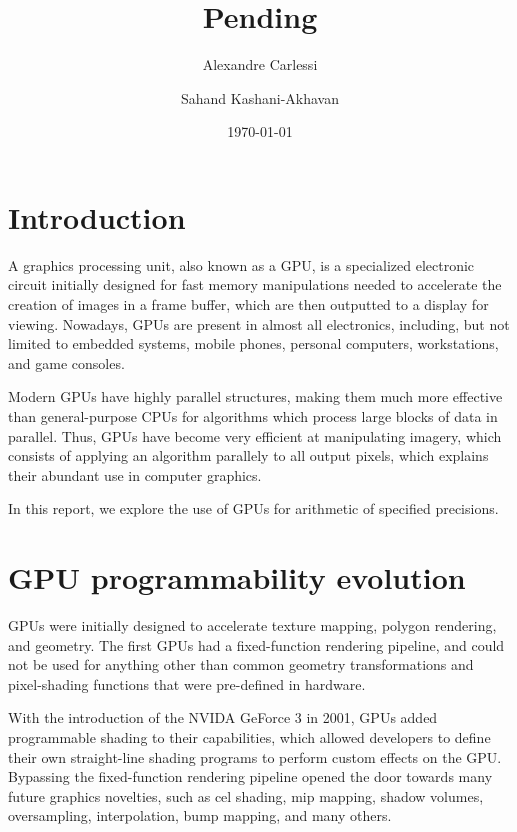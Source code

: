 \documentclass[10pt, a4paper]{report}
\begin{document}
\title{Pending}
\author{Alexandre Carlessi \and Sahand Kashani-Akhavan}
\date{\today}
\maketitle

\tableofcontents
\clearpage

\section{Introduction}
A graphics processing unit, also known as a GPU, is a specialized electronic
circuit initially designed for fast memory manipulations needed to accelerate
the creation of images in a frame buffer, which are then outputted to a display
for viewing.
Nowadays, GPUs are present in almost all electronics, including, but not limited
to embedded systems, mobile phones, personal computers, workstations, and game
consoles.

Modern GPUs have highly parallel structures, making them much more effective
than general-purpose CPUs for algorithms which process large blocks of data in
parallel.
Thus, GPUs have become very efficient at manipulating imagery, which consists
of applying an algorithm parallely to all output pixels, which explains their
abundant use in computer graphics.

In this report, we explore the use of GPUs for arithmetic of specified
precisions.

\section{GPU programmability evolution}
GPUs were initially designed to accelerate texture mapping, polygon rendering,
and geometry.
The first GPUs had a fixed-function rendering pipeline, and could not be used
for anything other than common geometry transformations and pixel-shading
functions that were pre-defined in hardware.

With the introduction of the NVIDA GeForce 3 in 2001, GPUs added programmable
shading to their capabilities, which allowed developers to define their own
straight-line shading programs to perform custom effects on the GPU.
Bypassing the fixed-function rendering pipeline opened the door towards many
future graphics novelties, such as cel shading, mip mapping, shadow volumes,
oversampling, interpolation, bump mapping, and many others.
\end{document}

